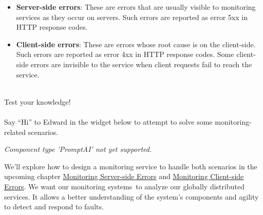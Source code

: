 \begin{itemize}
\item
\protect{}\label{EJpqPqRtGd2aHDBVA30G2}
\textbf{Server-side errors}: These are errors that are usually visible to monitoring services as they occur on servers. Such errors are reported as error 5xx in HTTP response codes.
\item
\protect{}\label{C1x3pp8kiBfEisvZyDtsL}
\textbf{Client-side errors}: These are errors whose root cause is on the client-side. Such errors are reported as error 4xx in HTTP response codes. Some client-side errors are invisible to the service when client requests fail to reach the service.
\end{itemize}
\\
Test your knowledge!\\
\\
Say ``Hi'' to Edward in the widget below to attempt to solve some monitoring-related scenarios.

\textit{Component type 'PromptAI' not yet supported.}

We'll explore how to design a monitoring service to handle both scenarios in the upcoming chapter \href{https://www.educative.io/courses/grokking-the-system-design-interview/design-of-a-monitoring-system}{Monitoring Server-side Errors} and \href{https://www.educative.io/courses/grokking-the-system-design-interview/focus-on-client-side-errors-in-a-monitoring-system}{Monitoring Client-side Errors}. We want our monitoring systems~to analyze our globally distributed services. It allows a better understanding of the system's components and agility to detect and respond to faults.

